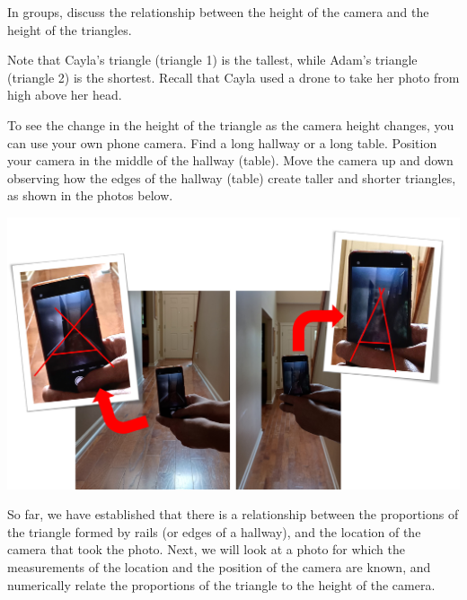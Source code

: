 \documentclass{ximera}
\begin{document}
\begin{exploration}
In groups, discuss the relationship between the height of the camera and the height of the triangles.

\begin{expandable}
    Note that Cayla's triangle (triangle 1) is the tallest, while Adam's triangle (triangle 2) is the shortest.  Recall that Cayla used a drone to take her photo from high above her head.  
\end{expandable}

To see the change in the height of the triangle as the camera height changes, you can use your own phone camera.  Find a long hallway or a long table.  Position your camera in the middle of the hallway (table).  Move the camera up and down observing how the edges of the hallway (table) create taller and shorter triangles, as shown in the photos below.

\begin{image}
         \includegraphics[width=6in]{doItYourself.jpg}
\end{image}

\begin{multipleChoice}
    \end{multipleChoice}

\end{exploration}

So far, we have established that there is a relationship between the proportions of the triangle formed by rails (or edges of a hallway), and the location of the camera that took the photo.  Next, we will look at a photo for which the measurements of the location and the position of the camera are known, and numerically relate the proportions of the triangle to the height of the camera.
\end{document}
